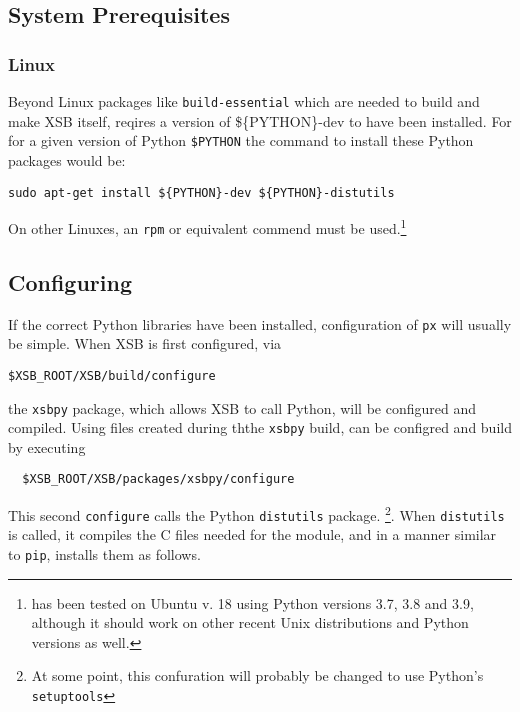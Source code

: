
\subsection{System Prerequisites}

\subsubsection{Linux}


Beyond Linux packages like {\tt build-essential} which are needed to
build and make XSB itself, \px{} reqires a version of \$\{PYTHON\}-dev
to have been installed.  
For for a given version of Python {\tt \$PYTHON} the command to
install these Python packages would be:

{\tt sudo apt-get install \$\{PYTHON\}-dev \$\{PYTHON\}-distutils}

On other Linuxes, an {\tt rpm} or equivalent commend must be
used.\footnote{\px{} has been tested on Ubuntu v. 18 using Python
  versions 3.7, 3.8 and 3.9, although it should work on other recent
  Unix distributions and Python versions as well.}



\subsection{Configuring \px{}}

If the correct Python libraries have been installed, configuration of
{\tt px} will usually be simple.  When XSB is first configured, via
\begin{verbatim}
$XSB_ROOT/XSB/build/configure
\end{verbatim}
the {\tt xsbpy} package, which allows XSB to call Python, will be
configured and compiled.  Using files created during ththe {\tt xsbpy}
build, \px{} can be configred and build by executing
\begin{verbatim}
  $XSB_ROOT/XSB/packages/xsbpy/configure
\end{verbatim}
This second {\tt configure} calls the Python {\tt distutils}
package. \footnote{At some point, this confuration will probably be
  changed to use Python's {\tt setuptools}}.  When {\tt distutils} is
called, it compiles the C files needed for the \px{} module, and in a
manner similar to {\tt pip}, installs them as follows.

